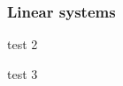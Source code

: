 \documentclass{checkin}
\begin{document}
\begin{frame}\frametitle{Linear systems} 
\begin{choices}
\item {}
\item test 2
\item test 3
\end{choices}
\end{frame}
\end{document}
